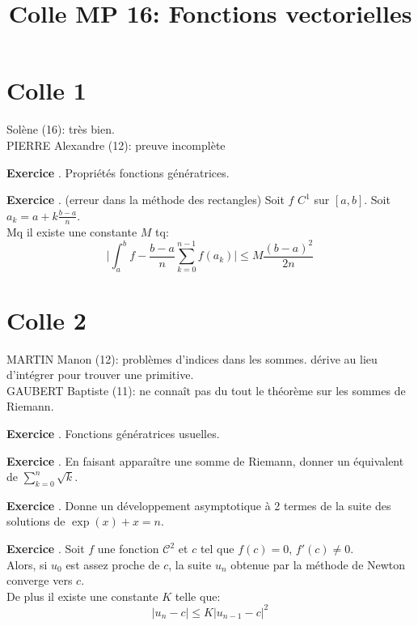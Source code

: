 \documentclass[10pt,a4paper]{article}
\title{Colle MP 16: Fonctions vectorielles}
\newcounter{question}
\newcounter{exo}
\newenvironment{exo}{\vspace{0.5cm}\setcounter{question}{0}\addtocounter{exo}{1} \noindent \textbf{Exercice \theexo}. \normalsize }{\par}
\begin{document}
	\maketitle
	
	\section*{Colle 1}
	Solène (16): très bien.\\
	PIERRE Alexandre (12): preuve incomplète\\
	
	\begin{exo}
		Propriétés fonctions génératrices.
	\end{exo}

	\begin{exo} (erreur dans la méthode des rectangles)
		Soit $f$ $C^1$ sur $[a, b]$. Soit $a_k = a + k\frac{b-a}{n}$.\\ Mq il existe une constante $M$ tq:
		$$\vert \int_{a}^{b} f - \frac{b-a}{n} \sum_{k=0}^{n-1} f(a_k) \vert \leq M \frac{(b-a)^2}{2n}$$
	\end{exo}
	
	\section*{Colle 2}
	\setcounter{exo}{0}
	MARTIN Manon (12): problèmes d'indices dans les sommes. dérive au lieu d'intégrer pour trouver une primitive.\\
	GAUBERT Baptiste (11): ne connaît pas du tout le théorème sur les sommes de Riemann.\\
	
	\begin{exo}
		Fonctions génératrices usuelles.
	\end{exo}

	\begin{exo}
		En faisant apparaître une somme de Riemann, donner un équivalent de $\sum_{k=0}^{n} \sqrt{k}$.
	\end{exo}
	
	\begin{exo}
		Donne un développement asymptotique à 2 termes de la suite des solutions de $\exp(x) + x = n$.
	\end{exo}

	\begin{exo}
		Soit $f$ une fonction $\mathcal{C}^2$ et $c$ tel que $f(c) = 0$, $f'(c) \neq 0$.\\
		Alors, si $u_0$ est assez proche de $c$, la suite $u_n$ obtenue par la méthode de Newton converge vers $c$.\\
		De plus il existe une constante $K$ telle que:
		$$\vert u_{n} - c \vert \leq K \vert u_{n-1} - c \vert^2$$
	\end{exo}
	
\end{document}
